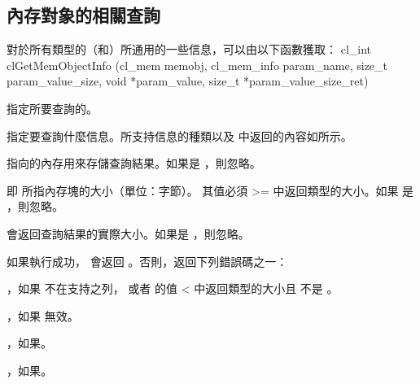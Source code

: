 \subsection{內存對象的相關查詢}

對於所有類型的（和）所通用的一些信息，可以由以下函數獲取：
\startclc
cl_int clGetMemObjectInfo (cl_mem memobj,
			cl_mem_info param_name,
			size_t param_value_size,
			void *param_value,
			size_t *param_value_size_ret)
\stopclc

 指定所要查詢的。

 指定要查詢什麼信息。所支持信息的種類以及  中返回的內容如所示。

 指向的內存用來存儲查詢結果。如果是 ，則忽略。

 即  所指內存塊的大小（單位：字節）。
其值必須 >= 中返回類型的大小。如果  是 ，則忽略。

 會返回查詢結果的實際大小。如果是 ，則忽略。

如果執行成功， 會返回 。否則，返回下列錯誤碼之一：
\startigBase
\item {}，如果  不在支持之列，
  或者  的值 < 中返回類型的大小且  不是 。
\item {}，如果  無效。
\item {}，如果\scdevfailres。
\item {}，如果\schostfailres。
\stopigBase

{}

